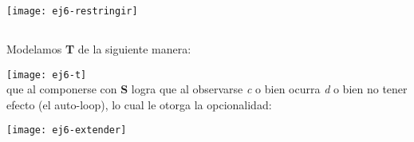 \texttt{[image: ej6-restringir]} \\

\subsection{}
Modelamos \textbf{T} de la siguiente manera:

\texttt{[image: ej6-t]} \\

que al componerse con \textbf{S} logra que al observarse \textit{c} o bien ocurra \textit{d} o bien no tener efecto (el auto-loop), lo cual le otorga la opcionalidad:

\texttt{[image: ej6-extender]} \\